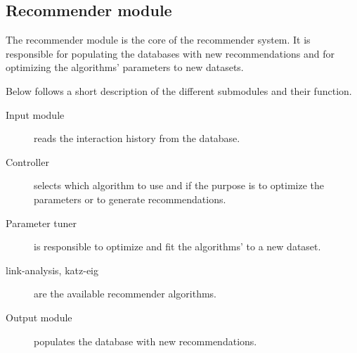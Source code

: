 
\subsection{Recommender module}

The recommender module is the core of the recommender system. It is responsible for populating the databases with new recommendations and for optimizing the algorithms' parameters to new datasets.


Below follows a short description of the different submodules and their function.

\begin{description}
    \item[Input module] reads the interaction history from the database.
    \item[Controller] selects which algorithm to use and if the purpose is to optimize the parameters or to generate recommendations.
    \item[Parameter tuner] is responsible to optimize and fit the algorithms' to a new dataset.
    \item[link-analysis, katz-eig] are the available recommender algorithms.
    \item[Output module] populates the database with new recommendations.
\end{description}

